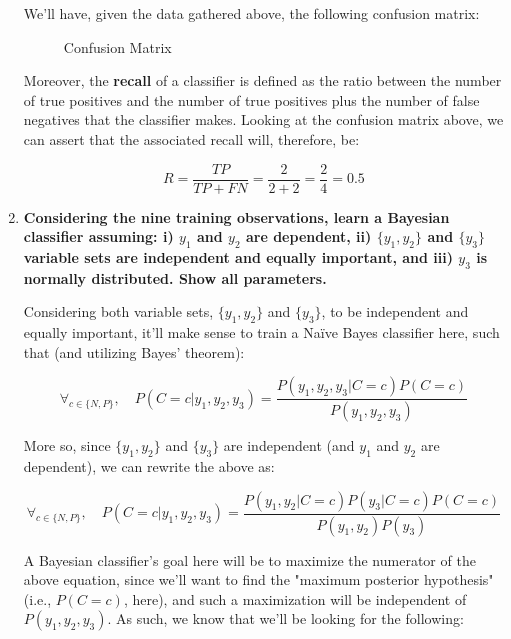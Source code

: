 \documentclass[12pt]{article}
\begin{document}
\begin{enumerate}[leftmargin=\labelsep]
        We'll have, given the data gathered above, the following confusion matrix:

        \begin{figure}[H]
          \centering
          
          \caption{Confusion Matrix}
        \end{figure}

        Moreover, the \textbf{recall} of a classifier is defined as the ratio between the number of
        true positives and the number of true positives plus the number of false negatives that the
        classifier makes. Looking at the confusion matrix above, we can assert that the associated
        recall will, therefore, be:

        $$
          R = \frac{TP}{TP + FN} = \frac{2}{2 + 2} = \frac{2}{4} = 0.5
        $$

        \pagebreak

  \item \textbf{Considering the nine training observations, learn a Bayesian classifier assuming:
          i) $y_1$ and $y_2$ are dependent, ii) $\{y_1 , y_2\}$ and $\{y_3 \}$ variable sets are
          independent and equally important, and iii) $y_3$ is normally distributed. Show all parameters.}

        Considering both variable sets, $\{y_1, y_2\}$ and $\{y_3\}$, to be independent and equally important,
        it'll make sense to train a Naïve Bayes classifier here, such that (and utilizing
        Bayes' theorem):

        \begin{equation} \label{eq:classifier}
          \forall_{c \in \{N, P\}},\quad P(C = c | y_1, y_2, y_3) = \frac{P(y_1, y_2, y_3 | C = c) P(C = c)}{P(y_1, y_2, y_3)}
        \end{equation}

        More so, since $\{y_1, y_2\}$ and $\{y_3\}$ are independent (and $y_1$ and $y_2$ are dependent),
        we can rewrite the above as:

        \begin{equation} \label{eq:classifier-expanded}
          \forall_{c \in \{N, P\}},\quad P(C = c | y_1, y_2, y_3) = \frac{P(y_1, y_2 | C = c) P(y_3 | C = c) P(C = c)}{P(y_1, y_2) P(y_3)}
        \end{equation}

        A Bayesian classifier's goal here will be to maximize the numerator of the above equation,
        since we'll want to find the "maximum posterior hypothesis" (i.e., $P(C = c)$, here), and
        such a maximization will be independent of $P(y_1, y_2, y_3)$. As such, we know that
        we'll be looking for the following:


\end{enumerate}
\end{document}
